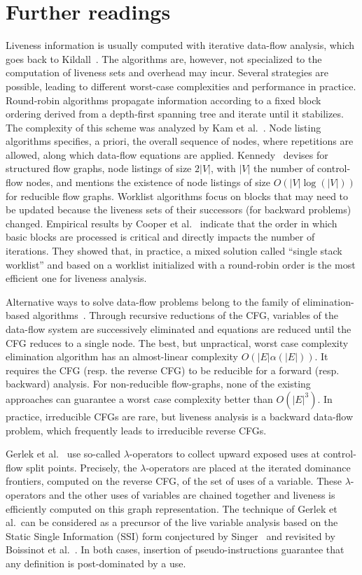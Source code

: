 \section{Further readings}
\label{sec:liveness:further}
Liveness information is usually computed with iterative
data-flow analysis, which goes back to Kildall~\cite{Kildall}. The algorithms are,
however, not specialized to the computation of liveness sets and overhead may
incur. Several strategies are possible, leading to
different worst-case complexities and performance in practice. Round-robin algorithms
propagate information according to a fixed block ordering derived from a
depth-first spanning tree and iterate until it stabilizes.  The complexity of
this scheme was analyzed by Kam et al.~\cite{novillo:bib:KU76}.  
Node listing algorithms specifies, a priori, the overall sequence of nodes, where repetitions are allowed, along which data-flow equations are applied.
Kennedy~\cite{Kennedy75} devises for structured flow graphs, node listings of size $2|V|$, with $|V|$ the number of control-flow nodes, and mentions the existence of node listings of size $O\left(|V| \log(|V|)\right)$ for reducible flow graphs.
Worklist algorithms focus on blocks that may need
to be updated because the liveness sets of their successors (for
backward problems) changed.
Empirical results by Cooper et al.~\cite{CHK06} indicate that the order in
which basic blocks are processed is critical and directly impacts the number of
iterations. They showed that, in practice, a mixed solution called ``single
stack worklist'' and based on a worklist initialized with a round-robin order is
the most efficient one  for liveness analysis. 

Alternative ways to solve data-flow problems belong to the family of elimina\-tion-based algorithms~\cite{RyPa86b}. Through recursive reductions of the 
CFG, variables of the data-flow system are successively eliminated and equations are reduced until the CFG reduces to a single node. 
The best, but unpractical, worst case complexity elimination algorithm has an almost-linear complexity $O(|E|\alpha(|E|))$. 
It requires the CFG (resp. the reverse CFG) to be reducible for a forward (resp.  backward) analysis.
For non-reducible flow-graphs, none of the existing approa\-ches can guarantee a worst case complexity better than $O(|E|^3)$.
In practice, irreducible CFGs are rare, but liveness
analysis is a backward data-flow problem, which frequently leads to
irreducible reverse CFGs. 

Gerlek et al.~\cite{gerlek94reference} use so-called $\lambda$-operators to collect upward exposed uses at control-flow split points.
Precisely, the $\lambda$-operators are placed at the iterated dominance frontiers, computed on the reverse CFG, of the set of uses of a variable.
These $\lambda$-operators and the other uses of variables are chained together and liveness is efficiently computed on this graph representation.
The technique of Gerlek et al.~can be considered as a precursor of the live variable analysis based on the Static Single Information (SSI) form conjectured by Singer~\cite{novillo:bib:S05} and revisited by Boissinot et al.~\cite{BoissinotBDR12}.
In both cases, insertion of pseudo-instructions guarantee that any definition is post-dominated by a use.

